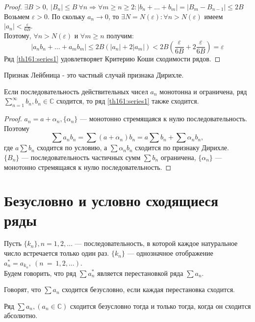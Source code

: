 \begin{proof}
  $\exists B > 0, \ |B_n| \leq B \ \forall n \Rightarrow \forall m \geq n \geq 2:
  |b_n + \dots + b_m| = |B_m - B_{n - 1}| \leq 2B$ \\
  Возьмем $\varepsilon > 0$. По скольку $a_n \to 0$, то
  $\exists N = N(\varepsilon): \forall n > N(\varepsilon)$ имеем
  $|a_n| < \frac{\varepsilon}{6B}$.\\
  Поэтому, $\forall n > N(\varepsilon)$ и $\forall m \geq n$ получим:
  $$|a_n b_n + \dots + a_m b_m| \leq 2B(|a_n| + 2|a_m|) <
  2B\left(\frac{\varepsilon}{6B} + 2 \frac{\varepsilon}{6B} \right) = \varepsilon$$
  Ряд \ref{th161:series1} удовлетворяет Критерию Коши сходимости рядов.
\end{proof}
\begin{remark}
  Признак Лейбница - это частный случай признака Дирихле. \\
\end{remark}

\begin{theorem}
  Если последовательность действительных чисел $a_n$ монотонна и ограничена,
  ряд $\sum\limits_{n = 1}^{\infty} b_n, b_n \in \mathbb{C}$ сходится, то ряд
  \ref{th161:series1} также сходится.
\end{theorem}

\begin{proof}
  $a_n = a + \alpha_n, \{\alpha_n\}$ --- монотонно стремящаяся к нулю
  последовательность. \\
  Поэтому
  $$\sum a_n b_n = \sum (a + \alpha_n)b_n = a \sum b_n + \sum \alpha_n b_n, $$
  где $a \sum b_n$ сходится по условию, а $\sum \alpha_n b_n$ сходится по
  признаку Дирихле. \\
  $\{B_n\}$ --- последовательность частичных сумм $\sum b_n$ ограничена,
  $\{\alpha_n\}$ --- монотонно стремящаяся к нулю последовательность.
\end{proof}

\section{Безусловно и условно сходящиеся ряды}
\begin{definition}
  Пусть $\{k_n\}, n = 1, 2, \dots$ --- последовательность, в которой каждое
  натуральное число встречается только один раз. $\{k_n\}$ --- однозначное
  отображение $a_n^* = a_{k_n}, \ (n~=~1, 2, \dots)$. \\
  Будем говорить, что ряд $\sum a_n^*$ является перестановкой ряда $\sum a_n$.
\end{definition}
\begin{definition}
  Говорят, что $\sum a_n$ сходится безусловно, если каждая перестановка
  сходится.
\end{definition}
\begin{theorem}
  \label{th171}
  Ряд $\sum a_n, (a_n \in \mathbb{C})$ сходится безусловно тогда и только тогда,
  когда он сходится абсолютно.
\end{theorem}

